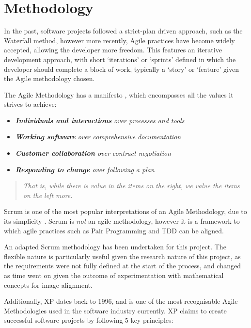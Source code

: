 \section{Methodology}

In the past, software projects followed a strict-plan driven approach, such as the Waterfall method, however more recently, Agile practices have become widely accepted, allowing the developer more freedom. This features an iterative development approach, with short `iterations' or `sprints' defined in which the developer should complete a block of work, typically a `story' or `feature' given the Agile methodology chosen.

The Agile Methodology has a manifesto \cite{Manifesto}, which encompasses all the values it strives to achieve:
\begin{itemize}
  \item \textit{\textbf{Individuals and interactions} over processes and tools}
  \item \textit{\textbf{Working software} over comprehensive documentation}
  \item \textit{\textbf{Customer collaboration} over contract negotiation}
  \item \textit{\textbf{Responding to change} over following a plan}
\end{itemize}

\begin{quotation}
  \textit{That is, while there is value in the items on the right, we value the items on the left more.}
\end{quotation}

Scrum is one of the most popular interpretations of an Agile Methodology, due to its simplicity \cite{scrum}. Scrum is \textit{not} an agile methodology, however it is a framework to which agile practices such as Pair Programming and \acrfull{TDD} can be aligned.

An adapted Scrum methodology has been undertaken for this project. The flexible nature is particularly useful given the research nature of this project, as the requirements were not fully defined at the start of the process, and changed as time went on given the outcome of experimentation with mathematical concepts for image alignment.

Additionally, \acrfull{XP} \cite{xp} dates back to 1996, and is one of the most recognisable Agile Methodologies used in the software industry currently. \acrshort{XP} claims to create successful software projects by following 5 key principles:

